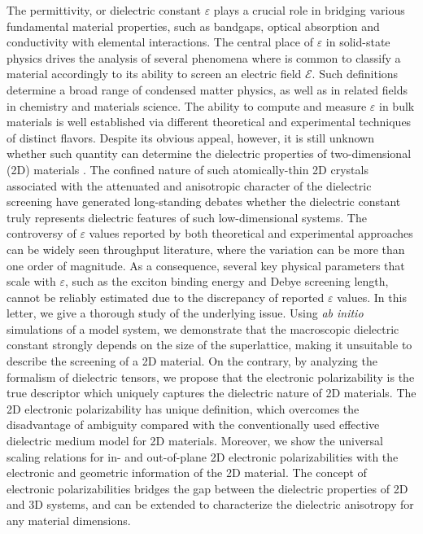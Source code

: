 The permittivity, or dielectric constant $\varepsilon$ plays a crucial
role in bridging various fundamental material properties, such as
bandgaps\cite{Moss_1950_relation,Moss_1985_n_Eg}, optical
absorption\cite{Kittel_2005_introduction_book} and
conductivity\cite{Dressel_2001_electrodynamics} with elemental
interactions.  The central place of $\varepsilon$ in solid-state
physics drives the analysis of several phenomena where is common to
classify a material accordingly to its ability to screen an electric
field $\mathscr{E}$. Such definitions determine a broad range of condensed
matter physics, as well as in related fields in chemistry and
materials science.  The ability to compute and measure $\varepsilon$
in bulk materials is well established via different theoretical
\cite{Adler_1962_eps,Hybertsen_1987} and experimental techniques
\cite{Palik_1998_handbook} of distinct flavors.
%
Despite its obvious appeal, however, it is still unknown whether such quantity can determine the 
dielectric properties of two-dimensional (2D) materials \cite{Novoselov_2016_vdW}.  
%
The confined nature of such atomically-thin 2D crystals associated
with the attenuated and anisotropic character of the dielectric
screening
\cite{Keldysh_1979_eps_multi,Sharma_1985_semiconductor_slab_eps,Low_2014_screening_BP,Cudazzo_2011_screening_2D,Bechstedt_2012_silicene,Cudazzo_2010_screen2D,Nazarov_2015_2D_3D}
have generated long-standing debates whether the dielectric constant
truly represents dielectric features of such low-dimensional systems.
The controversy of $\varepsilon$ values reported by both theoretical
and experimental approaches can be widely seen throughput
literature\cite{Li_2016_screening_rev}, where the variation can be
more than one order of magnitude.
%
As a
consequence, several key physical parameters that scale with
$\varepsilon$, such as the exciton binding energy and Debye screening
length, cannot be reliably estimated due to the discrepancy of
reported $\varepsilon$ values. In this letter, we give a thorough
study of the underlying issue. Using \textit{ab initio} simulations of
a model system, we demonstrate that the macroscopic dielectric
constant strongly depends on the size of the superlattice, making it
unsuitable to describe the screening of a 2D material. On the
contrary, by analyzing the formalism of dielectric tensors, we propose
that the electronic polarizability is the true descriptor which
uniquely captures the dielectric nature of 2D materials. The 2D
electronic polarizability has unique definition, which overcomes the
disadvantage of ambiguity compared with the conventionally used
effective dielectric medium model for 2D materials. Moreover, we show
the universal scaling relations for in- and out-of-plane 2D electronic
polarizabilities with the electronic and geometric information of the
2D material. The concept of electronic polarizabilities bridges the
gap between the dielectric properties of 2D and 3D systems, and can be
extended to characterize the dielectric anisotropy for any material
dimensions.


